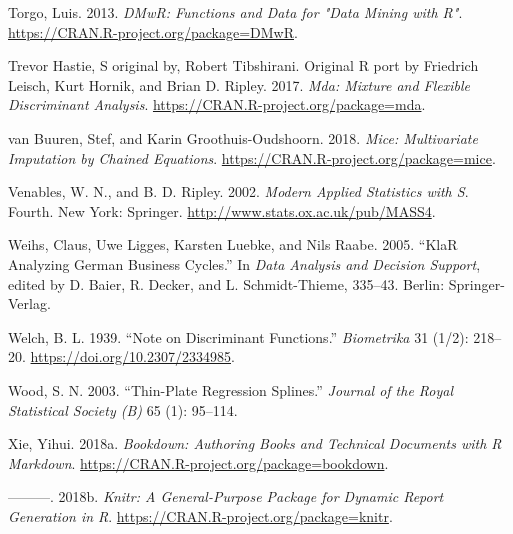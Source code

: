 \documentclass[]{book}
\theoremstyle{plain}
\theoremstyle{definition}
\theoremstyle{definition}
\theoremstyle{definition}
\theoremstyle{definition}
\theoremstyle{remark}
\begin{document}
\leavevmode\hypertarget{ref-R-DMwR}{}%
Torgo, Luis. 2013. \emph{DMwR: Functions and Data for "Data Mining with R"}. \url{https://CRAN.R-project.org/package=DMwR}.

\leavevmode\hypertarget{ref-R-mda}{}%
Trevor Hastie, S original by, Robert Tibshirani. Original R port by Friedrich Leisch, Kurt Hornik, and Brian D. Ripley. 2017. \emph{Mda: Mixture and Flexible Discriminant Analysis}. \url{https://CRAN.R-project.org/package=mda}.

\leavevmode\hypertarget{ref-R-mice}{}%
van Buuren, Stef, and Karin Groothuis-Oudshoorn. 2018. \emph{Mice: Multivariate Imputation by Chained Equations}. \url{https://CRAN.R-project.org/package=mice}.

\leavevmode\hypertarget{ref-R-MASS}{}%
Venables, W. N., and B. D. Ripley. 2002. \emph{Modern Applied Statistics with S}. Fourth. New York: Springer. \url{http://www.stats.ox.ac.uk/pub/MASS4}.

\leavevmode\hypertarget{ref-R-klaR}{}%
Weihs, Claus, Uwe Ligges, Karsten Luebke, and Nils Raabe. 2005. ``KlaR Analyzing German Business Cycles.'' In \emph{Data Analysis and Decision Support}, edited by D. Baier, R. Decker, and L. Schmidt-Thieme, 335--43. Berlin: Springer-Verlag.

\leavevmode\hypertarget{ref-welch1939}{}%
Welch, B. L. 1939. ``Note on Discriminant Functions.'' \emph{Biometrika} 31 (1/2): 218--20. \url{https://doi.org/10.2307/2334985}.

\leavevmode\hypertarget{ref-R-mgcv}{}%
Wood, S. N. 2003. ``Thin-Plate Regression Splines.'' \emph{Journal of the Royal Statistical Society (B)} 65 (1): 95--114.

\leavevmode\hypertarget{ref-R-bookdown}{}%
Xie, Yihui. 2018a. \emph{Bookdown: Authoring Books and Technical Documents with R Markdown}. \url{https://CRAN.R-project.org/package=bookdown}.

\leavevmode\hypertarget{ref-R-knitr}{}%
---------. 2018b. \emph{Knitr: A General-Purpose Package for Dynamic Report Generation in R}. \url{https://CRAN.R-project.org/package=knitr}.
\end{document}
